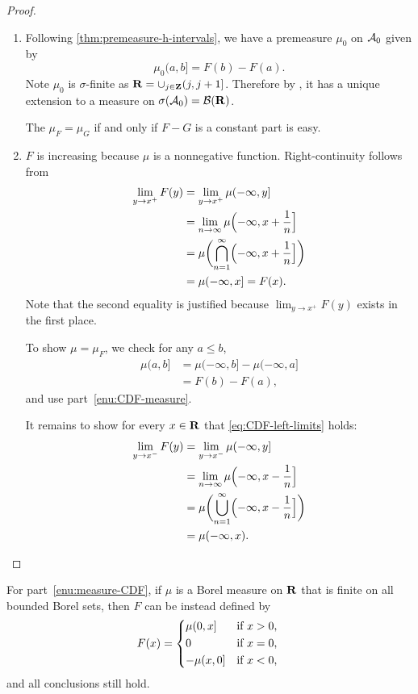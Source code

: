 \begin{proof} \leavevmode
    \begin{enumerate}
        \item Following \cref{thm:premeasure-h-intervals}, we have a premeasure $\mu_0$ on $\mathcal{A}_0$ given by \[
          \mu_0(a,b] = F(b) - F(a).
        \] Note $\mu_0$ is $\sigma$-finite as $\mathbf{R} = \cup_{j\in \mathbf{Z}} (j,j+1]$. Therefore by , it has a unique extension to a measure on $\sigma(\mathcal{A}_0) = \mathcal{B}(\mathbf{R})$.
        
        The $\mu_F = \mu_G$ if and only if $F - G$ is a constant part is easy.
        \item $F$ is increasing because $\mu$ is a nonnegative function. Right-continuity follows from \begin{align*}
            \lim_{y \to x^+} F(y) & = \lim_{y \to x^+} \mu(-\infty,y] \\ & = \lim_{n\to \infty} \mu\Bigl(-\infty,x+\frac{1}{n}\Bigr]\\& = \mu\biggl(\bigcap_{n=1}^\infty \Bigl(-\infty,x+\frac{1}{n}\Bigr]\biggr) \\
            & = \mu(-\infty,x] = F(x).
        \end{align*} Note that the second equality is justified because $\lim_{y \to x^+} F(y)$ exists in the first place.

        To show $\mu = \mu_F$, we check for any $a \leq b$, \begin{align*}
            \mu(a,b] & = \mu(-\infty,b] - \mu(-\infty,a] \\
                & = F(b) - F(a),
        \end{align*} and use part~\ref{enu:CDF-measure}.

        It remains to show for every $x \in \mathbf{R}$ that \eqref{eq:CDF-left-limits} holds: \begin{align*}
            \lim_{y \to x^-} F(y) & = \lim_{y \to x^-} \mu(-\infty,y] \\ 
            & = \lim_{n \to \infty} \mu\Bigl(-\infty,x-\frac{1}{n}\Bigr] \\
            & = \mu\biggl(\bigcup_{n=1}^\infty\Bigl(-\infty, x -\frac{1}{n}\Bigr]\biggr) \\
            & = \mu(-\infty,x). \qedhere
        \end{align*}
    \end{enumerate}
\end{proof}

    For part~\ref{enu:measure-CDF}, if $\mu$ is a Borel measure on $\mathbf{R}$ that is finite on all bounded Borel sets, then $F$ can be instead defined by \[
        F(x) = \begin{cases*}
            \mu (0,x] & if $x > 0$, \\
            0 & if $x = 0$, \\
            -\mu(x,0] & if $x < 0$,
        \end{cases*}
    \] and all conclusions still hold.

